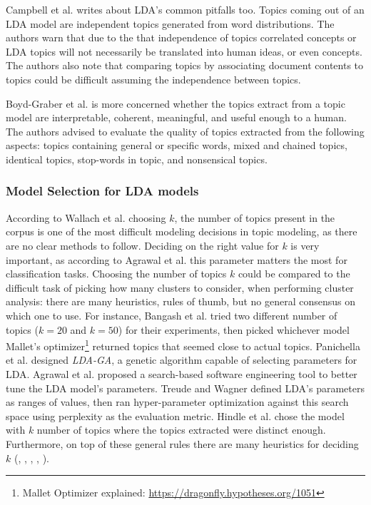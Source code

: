             Campbell et al. \cite{campbell2015latent} writes about LDA's common pitfalls too. Topics coming out of an LDA model are independent topics generated from word distributions. The authors warn that due to the that independence of topics correlated concepts or LDA topics will not  necessarily be translated into human ideas, or even concepts. The authors also note that comparing topics by associating document contents to topics could be difficult assuming the independence between topics.
            
            Boyd-Graber et al. \cite{boyd2014care} is more concerned whether the topics extract from a topic model are interpretable, coherent, meaningful, and useful enough to a human. The authors advised to evaluate the quality of topics extracted from the following aspects: topics containing general or specific words, mixed and chained topics, identical topics, stop-words in topic, and nonsensical topics.
            
        \subsubsection{Model Selection for LDA models}
        
            According to Wallach et al. \cite{wallach2009rethinking} choosing $k$, the number of topics present in the corpus is one of the most difficult modeling decisions in topic modeling, as there are no clear methods to follow. Deciding on the right value for $k$ is very important, as according to Agrawal et al. \cite{agrawal2018wrong} this parameter matters the most for classification tasks. Choosing the number of topics $k$ could be compared to the difficult task of picking how many clusters to consider, when performing cluster analysis: there are many heuristics, rules of thumb, but no general consensus on which one to use. For instance, Bangash et al. \cite{bangash2019developers} tried two different number of topics ($k=20$ and $k=50$) for their experiments, then picked whichever model Mallet’s optimizer\footnote{Mallet Optimizer explained: \url{https://dragonfly.hypotheses.org/1051}} returned topics that seemed close to actual topics. Panichella et al. \cite{panichella2013effectively} designed \textit{LDA-GA}, a genetic algorithm capable of selecting parameters for LDA. Agrawal et al. \cite{agrawal2018wrong} proposed a search-based software engineering tool to better tune the LDA model's parameters. Treude and Wagner \cite{treude2019predicting} defined LDA's parameters as ranges of values, then ran hyper-parameter optimization against this search space using perplexity as the evaluation metric. Hindle et al. \cite{hindle2012relating} chose the model with $k$ number of topics where the topics extracted were distinct enough. Furthermore, on top of these general rules there are many heuristics for deciding $k$ (\cite{arun2010finding}, \cite{cao2009density}, \cite{deveaud2014accurate}, \cite{griffiths2004finding}, \cite{zhao2015heuristic}).
            
